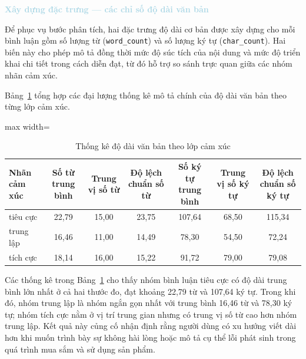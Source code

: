 \vspace{0.5em}
\noindent\textcolor{lightblue}{\textbf{Xây dựng đặc trưng --- các chỉ số độ dài văn bản}}\par
\vspace{0.5em}
Để phục vụ bước phân tích, hai đặc trưng độ dài cơ bản được xây dựng cho mỗi bình luận gồm số lượng từ (\texttt{word\_count}) và số lượng ký tự (\texttt{char\_count}). Hai biến này cho phép mô tả đồng thời mức độ súc tích của nội dung và mức độ triển khai chi tiết trong cách diễn đạt, từ đó hỗ trợ so sánh trực quan giữa các nhóm nhãn cảm xúc.

Bảng~\ref{tab:text_length_stats} tổng hợp các đại lượng thống kê mô tả chính của độ dài văn bản theo từng lớp cảm xúc.

\begin{table}[H]
    \centering
    \caption{Thống kê độ dài văn bản theo lớp cảm xúc}
    \label{tab:text_length_stats}
    \small
    \renewcommand{\arraystretch}{1.3}
    \begin{adjustbox}{max width=\textwidth}
    \begin{tabular}{|l|c|c|c|c|c|c|}
        \hline
        \rowcolor[HTML]{E8E8E8}
        \textbf{Nhãn cảm xúc} & \textbf{Số từ trung bình} & \textbf{Trung vị số từ} & \textbf{Độ lệch chuẩn số từ} & \textbf{Số ký tự trung bình} & \textbf{Trung vị số ký tự} & \textbf{Độ lệch chuẩn số ký tự} \\
        \hline
        tiêu cực & 22,79 & 15,00 & 23,75 & 107,64 & 68,50 & 115,34 \\
        \hline
        trung lập & 16,46 & 11,00 & 14,49 & 78,30 & 54,50 & 72,24 \\
        \hline
        tích cực & 18,14 & 16,00 & 15,22 & 91,72 & 79,00 & 79,08 \\
        \hline
    \end{tabular}
    \end{adjustbox}
\end{table}

Các thống kê trong Bảng~\ref{tab:text_length_stats} cho thấy nhóm bình luận tiêu cực có độ dài trung bình lớn nhất ở cả hai thước đo, đạt khoảng 22,79 từ và 107,64 ký tự. Trong khi đó, nhóm trung lập là nhóm ngắn gọn nhất với trung bình 16,46 từ và 78,30 ký tự; nhóm tích cực nằm ở vị trí trung gian nhưng có trung vị số từ cao hơn nhóm trung lập. Kết quả này củng cố nhận định rằng người dùng có xu hướng viết dài hơn khi muốn trình bày sự không hài lòng hoặc mô tả cụ thể lỗi phát sinh trong quá trình mua sắm và sử dụng sản phẩm.

